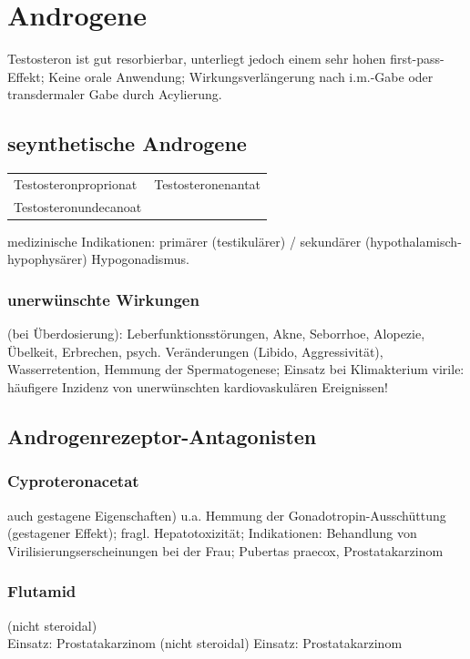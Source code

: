 \documentclass[10pt,a4paper]{report}
\begin{document}
\section{Androgene} %
\label{sec:androgene}
Testosteron ist gut resorbierbar, unterliegt jedoch einem sehr hohen first-pass-Effekt; Keine orale Anwendung; Wirkungsverlängerung nach i.m.-Gabe oder transdermaler Gabe durch Acylierung.
\subsection{seynthetische Androgene} %
\label{sub:seynthetische_androgene}
\begin{tabularx}{\textwidth}{XX}
Testosteronproprionat&Testosteronenantat\\
Testosteronundecanoat&\\
\end{tabularx}
medizinische Indikationen: primärer (testikulärer) / sekundärer (hypothalamisch-hypophysärer) Hypogonadismus.
\subsubsection{unerwünschte Wirkungen} %
\label{par:unerw_nschte_wirkungen}
(bei Überdosierung): Leberfunktionsstörungen, Akne, Seborrhoe, Alopezie, Übelkeit, Erbrechen, psych. Veränderungen (Libido, Aggressivität), Wasserretention, Hemmung der Spermatogenese; Einsatz bei Klimakterium virile: häufigere Inzidenz von unerwünschten kardiovaskulären Ereignissen!
\subsection{Androgenrezeptor-Antagonisten} %
\label{sub:androgenrezeptor_antagonisten}
\subsubsection{Cyproteronacetat} %
\label{par:cyproteronacetat}
auch gestagene Eigenschaften) u.a. Hemmung der Gonadotropin-Ausschüttung (gestagener Effekt); fragl. Hepatotoxizität; Indikationen: Behandlung von Virilisierungserscheinungen bei der Frau; Pubertas praecox, Prostatakarzinom
\subsubsection{Flutamid} %
\label{par:flutamid}
(nicht steroidal)\\
Einsatz: Prostatakarzinom
(nicht steroidal)
Einsatz: Prostatakarzinom
\end{document}
